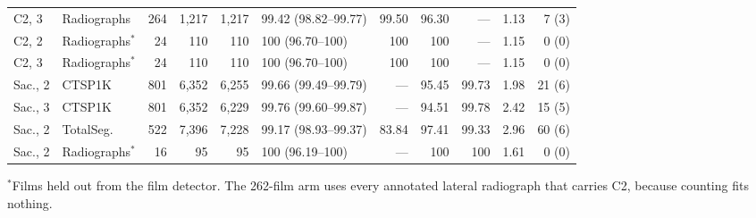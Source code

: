 \documentclass[11pt,letterpaper]{article}
\begin{document}
\begin{table}[htbp]
\begin{tabular}{llrrrlrrrrr}
C2, 3   & Radiographs & 264 & 1{,}217 & 1{,}217 & 99.42 (98.82--99.77) & 99.50 & 96.30 & --- & 1.13 &  7 (3) \\
C2, 2   & Radiographs$^{*}$ &  24 &   110 &   110 & 100 (96.70--100)     & 100 & 100 & --- & 1.15 &  0 (0) \\
C2, 3   & Radiographs$^{*}$ &  24 &   110 &   110 & 100 (96.70--100)     & 100 & 100 & --- & 1.15 &  0 (0) \\
\midrule
Sac., 2 & CTSP1K & 801 & 6{,}352 & 6{,}255 & 99.66 (99.49--99.79) & --- & 95.45 & 99.73 & 1.98 & 21 (6) \\
Sac., 3 & CTSP1K & 801 & 6{,}352 & 6{,}229 & 99.76 (99.60--99.87) & --- & 94.51 & 99.78 & 2.42 & 15 (5) \\
Sac., 2 & TotalSeg.    & 522 & 7{,}396 & 7{,}228 & 99.17 (98.93--99.37) & 83.84 & 97.41 & 99.33 & 2.96 & 60 (6) \\
Sac., 2 & Radiographs$^{*}$ &  16 &    95 &    95 & 100 (96.19--100)     & --- & 100 & 100 & 1.61 &  0 (0) \\
\bottomrule
\end{tabular}

\vspace{2pt}
\raggedright\scriptsize $^{*}$Films held out from the film detector. The 262-film arm uses every annotated
lateral radiograph that carries C2, because counting fits nothing.
\end{table}
\end{document}
